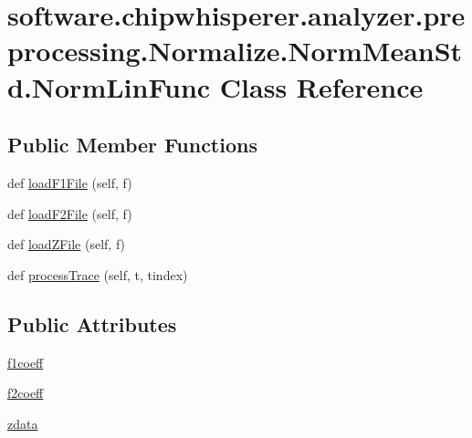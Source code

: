 \hypertarget{classsoftware_1_1chipwhisperer_1_1analyzer_1_1preprocessing_1_1Normalize_1_1NormMeanStd_1_1NormLinFunc}{}\section{software.\+chipwhisperer.\+analyzer.\+preprocessing.\+Normalize.\+Norm\+Mean\+Std.\+Norm\+Lin\+Func Class Reference}
\label{classsoftware_1_1chipwhisperer_1_1analyzer_1_1preprocessing_1_1Normalize_1_1NormMeanStd_1_1NormLinFunc}
\subsection*{Public Member Functions}
\begin{DoxyCompactItemize}
\item 
def \hyperlink{classsoftware_1_1chipwhisperer_1_1analyzer_1_1preprocessing_1_1Normalize_1_1NormMeanStd_1_1NormLinFunc_a2aab355f544123da03ea3e8b92ce728c}{load\+F1\+File} (self, f)
\item 
def \hyperlink{classsoftware_1_1chipwhisperer_1_1analyzer_1_1preprocessing_1_1Normalize_1_1NormMeanStd_1_1NormLinFunc_a5311aa6a4e41e84bb45428c2a92cb278}{load\+F2\+File} (self, f)
\item 
def \hyperlink{classsoftware_1_1chipwhisperer_1_1analyzer_1_1preprocessing_1_1Normalize_1_1NormMeanStd_1_1NormLinFunc_af58f59b678eda91d175c5ba9a6657413}{load\+Z\+File} (self, f)
\item 
def \hyperlink{classsoftware_1_1chipwhisperer_1_1analyzer_1_1preprocessing_1_1Normalize_1_1NormMeanStd_1_1NormLinFunc_a78d85e3a6c283404ea2d8de8a15602dd}{process\+Trace} (self, t, tindex)
\end{DoxyCompactItemize}
\subsection*{Public Attributes}
\begin{DoxyCompactItemize}
\item 
\hyperlink{classsoftware_1_1chipwhisperer_1_1analyzer_1_1preprocessing_1_1Normalize_1_1NormMeanStd_1_1NormLinFunc_aeb6f7fdd7f6d66cb8c9d0d1289781bb5}{f1coeff}
\item 
\hyperlink{classsoftware_1_1chipwhisperer_1_1analyzer_1_1preprocessing_1_1Normalize_1_1NormMeanStd_1_1NormLinFunc_a2cb8bcdf66d03ae637d6ebc4d17c0b9d}{f2coeff}
\item 
\hyperlink{classsoftware_1_1chipwhisperer_1_1analyzer_1_1preprocessing_1_1Normalize_1_1NormMeanStd_1_1NormLinFunc_a8ed7284f54917cc2c656e074114f37b8}{zdata}
\end{DoxyCompactItemize}
